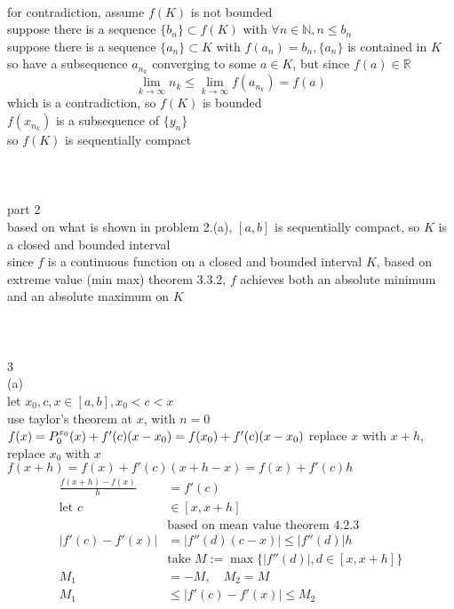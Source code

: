 \documentclass[12pt, border = 4pt, multi]{article} %
\begin{document}
\\
for contradiction, assume $f(K)$ is not bounded\\
suppose there is a sequence $\{b_n\} \subset f(K)$ with $\forall n \in \mathbb{N}, n \leq b_n$\\
suppose there is a sequence $\{a_n\} \subset K$ with $f(a_n) = b_n, \{a_n\}$ is contained in $K$ so have a subsequence $a_{n_k}$ converging to some $a \in K$, but since $f(a) \in \mathbb{R}$
\[\lim_{k \rightarrow \infty} n_k \leq \lim_{k \rightarrow \infty} f(a_{n_k}) = f(a)\]
which is a contradiction, so $f(K)$ is bounded\\
$f(x_{n_k})$ is a subsequence of $\{y_n\}$\\
so $f(K)$ is sequentially compact\\
\\
\\
\\
part 2\\
based on what is shown in problem 2.(a), $[a, b]$ is sequentially compact, so $K$ is a closed and bounded interval\\
since $f$ is a continuous function on a closed and bounded interval $K$, based on extreme value (min max) theorem 3.3.2, $f$ achieves both an absolute minimum and an absolute maximum on $K$\\
\\
\\
\\
3\\
(a)\\
let $x_0, c, x \in [a, b], x_0 < c < x$\\
use taylor's theorem at $x$, with $n = 0$\\
$f(x) = P_0 ^ {x_0}(x) + f'(c)(x - x_0) = f(x_0) + f'(c)(x - x_0)\\$
replace $x$ with $x + h$, replace $x_0$ with $x$\\
$f(x + h) = f(x) + f'(c)(x + h - x) = f(x) + f'(c)h$
\begin{align*}
\frac{f(x + h) - f(x)}{h} &= f'(c)\\
\text{let } c &\in [x, x + h]\\
&\text{based on mean value theorem 4.2.3}\\
|f'(c) - f'(x)| &= |f''(d)(c - x)| \leq |f''(d)|h\\
&\text{take } M := \max\{|f''(d)|, d \in [x, x + h]\}\\
M_1 &= -M,\quad M_2 = M\\
M_1 &\leq |f'(c) - f'(x)| \leq M_2\\
\end{align*}
\end{document}
